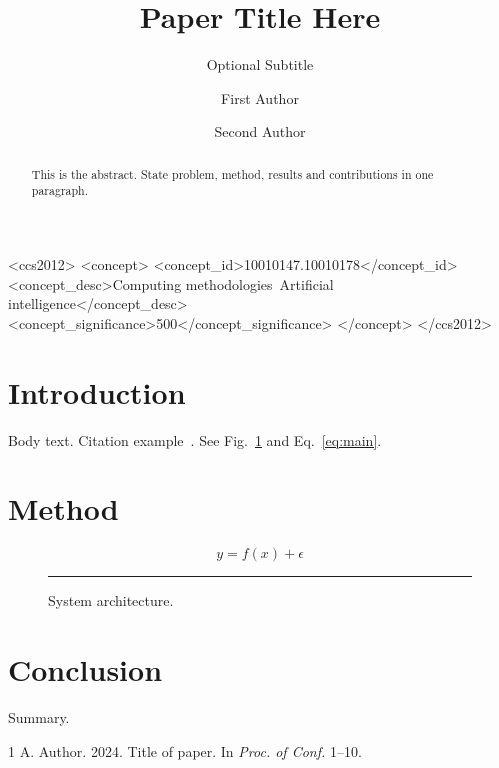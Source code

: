 \documentclass[sigconf]{acmart}
\begin{document}
\title{Paper Title Here}
\subtitle{Optional Subtitle}

\author{First Author}

\author{Second Author}

\renewcommand{\shortauthors}{Author et al.}

\begin{abstract}
This is the abstract. State problem, method, results and contributions in one paragraph.
\end{abstract}

\begin{CCSXML}
<ccs2012>
<concept>
<concept_id>10010147.10010178</concept_id>
<concept_desc>Computing methodologies~Artificial intelligence</concept_desc>
<concept_significance>500</concept_significance>
</concept>
</ccs2012>
\end{CCSXML}


\maketitle

\section{Introduction}
Body text. Citation example~\cite{ref1}. See Fig.~\ref{fig:arch} and Eq.~\eqref{eq:main}.

\section{Method}
\begin{equation}\label{eq:main}
  y = f(x) + \epsilon
\end{equation}

\begin{figure}[t]
  \centering
  \rule{0.6\columnwidth}{3cm}  %
  \caption{System architecture.}
  \label{fig:arch}
\end{figure}

\section{Conclusion}
Summary.


% 
\begin{thebibliography}{1}
 A. Author. 2024. Title of paper. In \textit{Proc. of Conf.} 1--10.
\end{thebibliography}
\end{document}
